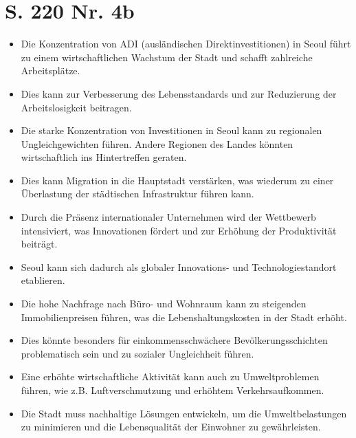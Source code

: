 \documentclass[12pt,a4paper]{report}
\begin{document}
	\section{S. 220 Nr. 4b}
	\begin{itemize}
		\item Die Konzentration von ADI (ausländischen Direktinvestitionen) in Seoul führt zu einem wirtschaftlichen Wachstum der Stadt und schafft zahlreiche Arbeitsplätze.
		\item Dies kann zur Verbesserung des Lebensstandards und zur Reduzierung der Arbeitslosigkeit beitragen.
		\item Die starke Konzentration von Investitionen in Seoul kann zu regionalen Ungleichgewichten führen. Andere Regionen des Landes könnten wirtschaftlich ins Hintertreffen geraten.
		\item Dies kann Migration in die Hauptstadt verstärken, was wiederum zu einer Überlastung der städtischen Infrastruktur führen kann.
		\item Durch die Präsenz internationaler Unternehmen wird der Wettbewerb intensiviert, was Innovationen fördert und zur Erhöhung der Produktivität beiträgt.
		\item Seoul kann sich dadurch als globaler Innovations- und Technologiestandort etablieren.
		\item Die hohe Nachfrage nach Büro- und Wohnraum kann zu steigenden Immobilienpreisen führen, was die Lebenshaltungskosten in der Stadt erhöht.
		\item Dies könnte besonders für einkommensschwächere Bevölkerungsschichten problematisch sein und zu sozialer Ungleichheit führen.
		\item Eine erhöhte wirtschaftliche Aktivität kann auch zu Umweltproblemen führen, wie z.B. Luftverschmutzung und erhöhtem Verkehrsaufkommen.
		\item Die Stadt muss nachhaltige Lösungen entwickeln, um die Umweltbelastungen zu minimieren und die Lebensqualität der Einwohner zu gewährleisten.
	\end{itemize}	
	
\end{document}
